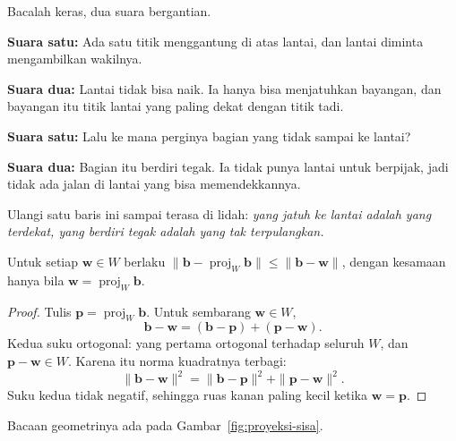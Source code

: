 \begin{bacakeras}
Bacalah keras, dua suara bergantian.

\textbf{Suara satu:} Ada satu titik menggantung di atas lantai, dan lantai diminta mengambilkan wakilnya.

\textbf{Suara dua:} Lantai tidak bisa naik. Ia hanya bisa menjatuhkan bayangan, dan bayangan itu titik lantai yang paling dekat dengan titik tadi.

\textbf{Suara satu:} Lalu ke mana perginya bagian yang tidak sampai ke lantai?

\textbf{Suara dua:} Bagian itu berdiri tegak. Ia tidak punya lantai untuk berpijak, jadi tidak ada jalan di lantai yang bisa memendekkannya.

Ulangi satu baris ini sampai terasa di lidah: \emph{yang jatuh ke lantai adalah yang terdekat, yang berdiri tegak adalah yang tak terpulangkan.}
\end{bacakeras}

\begin{teorema}
Untuk setiap $\mathbf{w}\in W$ berlaku
$\|\mathbf{b}-\operatorname{proj}_{W}\mathbf{b}\|\le\|\mathbf{b}-\mathbf{w}\|$, dengan
kesamaan hanya bila $\mathbf{w}=\operatorname{proj}_{W}\mathbf{b}$.
\end{teorema}

\begin{proof}
Tulis $\mathbf{p}=\operatorname{proj}_{W}\mathbf{b}$. Untuk sembarang $\mathbf{w}\in W$,
\[
  \mathbf{b}-\mathbf{w}=(\mathbf{b}-\mathbf{p})+(\mathbf{p}-\mathbf{w}).
\]
Kedua suku ortogonal: yang pertama ortogonal terhadap seluruh $W$, dan
$\mathbf{p}-\mathbf{w}\in W$. Karena itu norma kuadratnya terbagi:
\[
  \|\mathbf{b}-\mathbf{w}\|^{2}=\|\mathbf{b}-\mathbf{p}\|^{2}+\|\mathbf{p}-\mathbf{w}\|^{2}.
\]
Suku kedua tidak negatif, sehingga ruas kanan paling kecil ketika $\mathbf{w}=\mathbf{p}$.
\end{proof}

Bacaan geometrinya ada pada Gambar~\ref{fig:proyeksi-sisa}.

